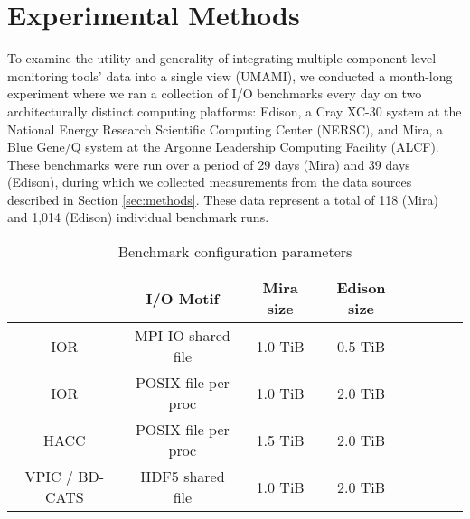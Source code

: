 \section{Experimental Methods} \label{sec:platforms}

To examine the utility and generality of integrating multiple component-level monitoring tools' data into a single view (UMAMI), we conducted a month-long experiment where we ran a collection of I/O benchmarks every day on two architecturally distinct computing platforms:
Edison, a Cray XC-30 system at the National Energy Research Scientific Computing Center (NERSC), and Mira, a Blue Gene/Q system at the Argonne Leadership Computing Facility (ALCF).
These benchmarks were run over a period of 29 days (Mira) and 39 days (Edison), during which we collected measurements from the data sources described in Section \ref{sec:methods}.  These data represent a total of 118 (Mira) and 1,014 (Edison) individual benchmark runs.



\begin{table}[h]
\footnotesize
\centering
\begin{tabular}{|c|c|c|c|c|c|c|c|}
\hline
 & \textbf{I/O Motif} & \textbf{Mira size} & \textbf{Edison size} \\
\hline
IOR & MPI-IO shared file & 1.0 TiB & 0.5 TiB\\
\hline
IOR & POSIX file per proc & 1.0 TiB & 2.0 TiB\\
\hline
HACC & POSIX file per proc & 1.5 TiB & 2.0 TiB \\
\hline
VPIC / BD-CATS & HDF5 shared file & 1.0 TiB & 2.0 TiB\\
\hline
\end{tabular}
\caption{Benchmark configuration parameters}
\label{tab:bench-config}
\normalsize
\vspace{-.4in}
\end{table}

